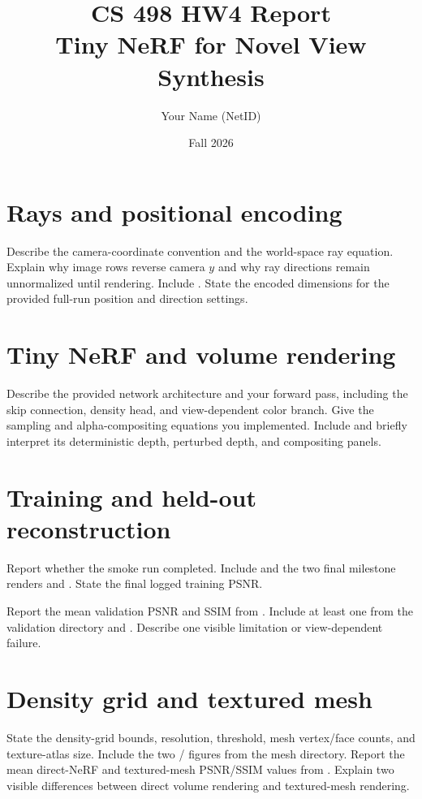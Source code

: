 \documentclass[11pt]{article}
\title{CS 498 HW4 Report\\Tiny NeRF for Novel View Synthesis}
\author{Your Name (NetID)}
\date{Fall 2026}
\begin{document}
\maketitle

\section{Rays and positional encoding}
Describe the camera-coordinate convention and the world-space ray equation.
Explain why image rows reverse camera $y$ and why ray directions remain
unnormalized until rendering. Include
. State the encoded dimensions for the
provided full-run position and direction settings.

\section{Tiny NeRF and volume rendering}
Describe the provided network architecture and your forward pass, including
the skip connection, density head, and view-dependent color branch. Give the
sampling and alpha-compositing equations you implemented. Include
 and briefly interpret its deterministic
depth, perturbed depth, and compositing panels.

\section{Training and held-out reconstruction}
Report whether the smoke run completed. Include
 and the two final milestone renders
 and . State the
final logged training PSNR.

Report the mean validation PSNR and SSIM from
. Include at least one
 from the validation directory and
. Describe one visible limitation or
view-dependent failure.

\section{Density grid and textured mesh}
State the density-grid bounds, resolution, threshold, mesh vertex/face counts,
and texture-atlas size. Include the two
/ figures from the
mesh directory. Report the mean direct-NeRF and textured-mesh PSNR/SSIM values
from . Explain two visible differences between
direct volume rendering and textured-mesh rendering.
\end{document}
